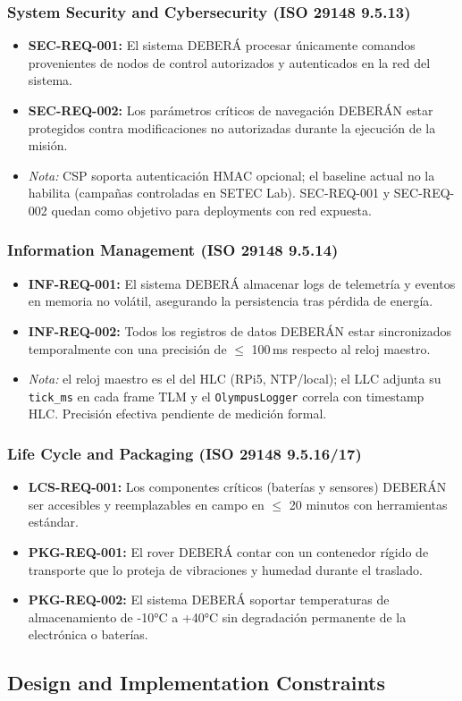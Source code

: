 \subsubsection{System Security and Cybersecurity (ISO 29148 9.5.13)}
\begin{itemize}
    \item \textbf{SEC-REQ-001:} El sistema DEBERÁ procesar únicamente comandos provenientes de nodos de control autorizados y autenticados en la red del sistema.
    \item \textbf{SEC-REQ-002:} Los parámetros críticos de navegación DEBERÁN estar protegidos contra modificaciones no autorizadas durante la ejecución de la misión.
    \item[] \emph{Nota:} CSP soporta autenticación HMAC opcional; el baseline actual no la habilita (campañas controladas en SETEC Lab). SEC-REQ-001 y SEC-REQ-002 quedan como objetivo para deployments con red expuesta.
\end{itemize}

\subsubsection{Information Management (ISO 29148 9.5.14)}
\begin{itemize}
    \item \textbf{INF-REQ-001:} El sistema DEBERÁ almacenar logs de telemetría y eventos en memoria no volátil, asegurando la persistencia tras pérdida de energía.
    \item \textbf{INF-REQ-002:} Todos los registros de datos DEBERÁN estar sincronizados temporalmente con una precisión de $\le$ 100\,ms respecto al reloj maestro.
    \item[] \emph{Nota:} el reloj maestro es el del HLC (RPi5, NTP/local); el LLC adjunta su \texttt{tick\_ms} en cada frame TLM y el \texttt{OlympusLogger} correla con timestamp HLC. Precisión efectiva pendiente de medición formal.
\end{itemize}

\subsubsection{Life Cycle and Packaging (ISO 29148 9.5.16/17)}
\begin{itemize}
    \item \textbf{LCS-REQ-001:} Los componentes críticos (baterías y sensores) DEBERÁN ser accesibles y reemplazables en campo en $\le$ 20 minutos con herramientas estándar.
    \item \textbf{PKG-REQ-001:} El rover DEBERÁ contar con un contenedor rígido de transporte que lo proteja de vibraciones y humedad durante el traslado.
    \item \textbf{PKG-REQ-002:} El sistema DEBERÁ soportar temperaturas de almacenamiento de -10°C a +40°C sin degradación permanente de la electrónica o baterías.
\end{itemize}

\subsection{Design and Implementation Constraints}
